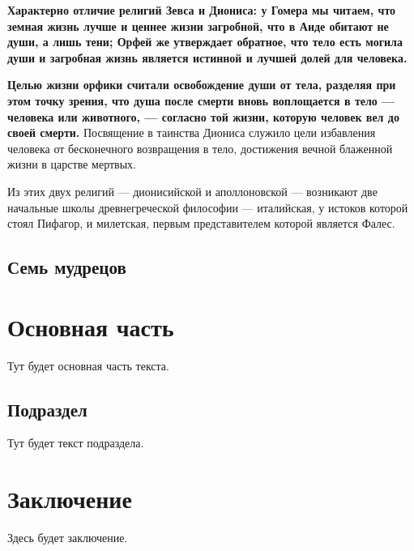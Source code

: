 	\par \textbf{Характерно отличие религий Зевса и Диониса: у Гомера мы читаем, что 
	земная жизнь лучше и ценнее жизни загробной, что в Аиде обитают не души, а лишь 
	тени; Орфей же утверждает обратное, что тело есть могила души и загробная жизнь 
	является истинной и лучшей долей для человека.}
    
	\par \textbf{Целью жизни орфики считали освобождение души от тела, 
	разделяя при этом точку зрения, что душа после смерти вновь воплощается в тело
	 — человека или животного, — согласно той жизни, которую человек вел до своей смерти.}
	Посвящение в таинства Диониса служило цели избавления человека от бесконечного 
	возвращения в тело, достижения вечной блаженной жизни в царстве мертвых. 
    
	\par Из этих двух религий — дионисийской и аполлоновской 
	— возникают две начальные школы древнегреческой философии — италийская, 
	у истоков которой стоял Пифагор, и милетская, первым представителем которой является 
	Фалес. 
	
	\subsection{Семь мудрецов}

	\par

	

	\section{Основная часть}
	Тут будет основная часть текста.
	\clearpage
	\subsection{Подраздел}
	Тут будет текст подраздела.
	\clearpage
	\section{Заключение}
	Здесь будет заключение.
	
